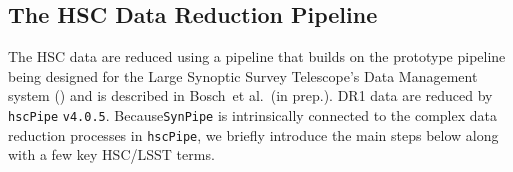 \documentclass[useamsfonts]{pasj01}
\def\etal{{\ et al.~}}
\def\hscpipe{\texttt{hscPipe}}
\def\synpipe{\texttt{SynPipe}}
\begin{document}

\subsection{The HSC Data Reduction Pipeline}
    \label{ssec:hscpipe}

    The HSC data are reduced using a pipeline that builds on the prototype pipeline 
    being designed for the Large Synoptic Survey Telescope’s Data Management system
    (\citealt{Ivezic2008, Axelrod2010, Juric2015}) and is described in 
    Bosch\etal (in prep.). 
    DR1 data are reduced by \hscpipe{} \texttt{v4.0.5}. 
    Because\synpipe{} is intrinsically connected to the complex data reduction
    processes in \hscpipe{}, we briefly introduce the main steps below along with a 
    few key HSC/LSST terms.
\end{document}
